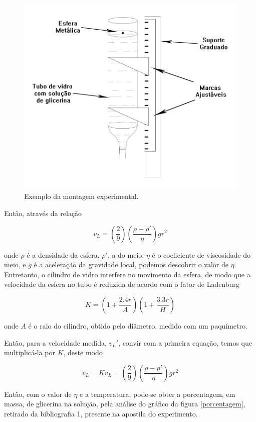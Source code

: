 \documentclass[12pt,a4paper]{article}
\begin{document}
\begin{figure}
\centering
\includegraphics[scale=0.3]{Fig5-1.jpg}
\caption{Exemplo da montagem experimental.}
\label{experimento}
\end{figure}

Então, através da relação

$$v_L = (\frac{2}{9}) (\frac{\rho - \rho'}{\eta}) g r^2$$

onde $\rho$ é a densidade da esfera, $\rho'$, a do meio, $\eta$ é o coeficiente de viscosidade do meio, e $g$ é a aceleração da gravidade local, podemos descobrir o valor de $\eta$.\\

Entretanto, o cilindro de vidro interfere no movimento da esfera, de modo que a velocidade da esfera no tubo é reduzida de acordo com o fator de Ladenburg

$$K = (1 + \frac{2.4r}{A})(1 + \frac{3.3r}{H})$$

onde $A$ é o raio do cilindro, obtido pelo diâmetro, medido com um paquímetro.

Então, para a velocidade medida, $v_L'$, convir com a primeira equação, temos que multiplicá-la por $K$, deste modo

$$v_L = Kv_L = (\frac{2}{9}) (\frac{\rho - \rho'}{\eta}) g r^2$$

Então, com o valor de $\eta$ e a temperatura, pode-se obter a porcentagem, em massa, de glicerina na solução, pela análise do gráfico da figura \ref{porcentagem}, retirado da bibliografia 1, presente na apostila do experimento.\\
\end{document}
